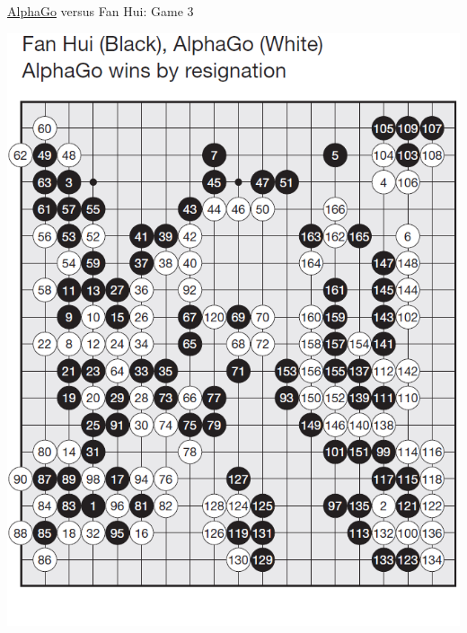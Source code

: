 \documentclass{beamer}
\begin{document}
{    \begin{frame}{{\color{white}\underline{AlphaGo}} versus {\color{black}Fan Hui}: Game 3}
      \begin{center}
        \includegraphics[height=.9\textheight]{../img/AlphaGo_vs_Fan_Hui_Game_3.png}
      \end{center}
    \end{frame}

}
\end{document}
